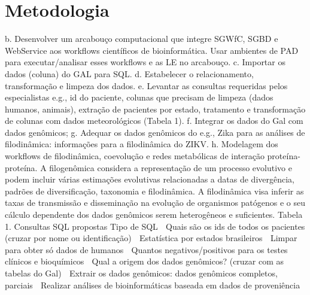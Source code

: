 \chapter{Metodologia}

b.	Desenvolver um arcabouço computacional que integre SGWfC, SGBD e WebService aos workflows científicos de bioinformática. Usar ambientes de PAD para executar/analisar esses workflows e as LE no arcabouço.
c.	Importar os dados (coluna) do GAL para SQL.
d.	Estabelecer o relacionamento, transformação e limpeza dos dados.
e.	Levantar as consultas requeridas pelos especialistas e.g., id do paciente, colunas que precisam de limpeza (dados humanos, animais), extração de pacientes por estado, tratamento e transformação de colunas com dados meteorológicos (Tabela 1).
f.	Integrar os dados do Gal com dados genômicos;
g.	Adequar os dados genômicos do e.g., Zika para as análises de filodinâmica: informações para a filodinâmica do ZIKV.
h.	Modelagem dos workflows de filodinâmica, coevolução e redes metabólicas de interação proteína-proteína. A filogenômica considera a representação de um processo evolutivo e podem incluir várias estimações evolutivas relacionadas a datas de divergência, padrões de diversificação, taxonomia e filodinâmica. A filodinâmica visa inferir as taxas de transmissão e disseminação na evolução de organismos patógenos e o seu cálculo dependente dos dados genômicos serem heterogêneos e suficientes. 
Tabela 1. Consultas SQL propostas
Tipo de SQL		Quais são os ids de todos os pacientes (cruzar por nome ou identificação)
	Estatística por estados brasileiros
	Limpar para obter só dados de humanos
	Quantos negativos/positivos para os testes clínicos e bioquímicos
	Qual a origem dos dados genômicos? (cruzar com as tabelas do Gal)
	Extrair os dados genômicos: dados genômicos completos, parciais
	Realizar análises de bioinformáticas baseada em dados de proveniência
